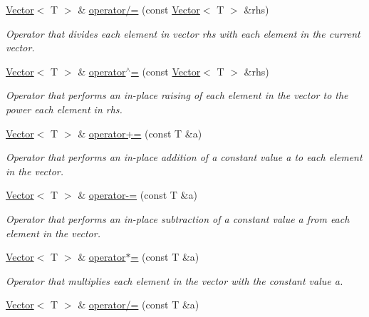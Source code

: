\begin{DoxyCompactItemize}
\mbox{\hyperlink{classVector}{Vector}}$<$ T $>$ \& \mbox{\hyperlink{classVector_adbf519ce5d68eb131947137e30596dc1}{operator/=}} (const \mbox{\hyperlink{classVector}{Vector}}$<$ T $>$ \&rhs)
\begin{DoxyCompactList}\small\item\em Operator that divides each element in vector {\ttfamily rhs} with each element in the current vector. \end{DoxyCompactList}\item 
\mbox{\hyperlink{classVector}{Vector}}$<$ T $>$ \& \mbox{\hyperlink{classVector_acd4d558272832a19d614468400ca605d}{operator$^\wedge$=}} (const \mbox{\hyperlink{classVector}{Vector}}$<$ T $>$ \&rhs)
\begin{DoxyCompactList}\small\item\em Operator that performs an in-\/place raising of each element in the vector to the power each element in {\ttfamily rhs}. \end{DoxyCompactList}\item 
\mbox{\hyperlink{classVector}{Vector}}$<$ T $>$ \& \mbox{\hyperlink{classVector_a5650df0775f0677f76259cd3f474dded}{operator+=}} (const T \&a)
\begin{DoxyCompactList}\small\item\em Operator that performs an in-\/place addition of a constant value {\ttfamily a} to each element in the vector. \end{DoxyCompactList}\item 
\mbox{\hyperlink{classVector}{Vector}}$<$ T $>$ \& \mbox{\hyperlink{classVector_a7581aba7a67b45ff1b2848d37e00cfa1}{operator-\/=}} (const T \&a)
\begin{DoxyCompactList}\small\item\em Operator that performs an in-\/place subtraction of a constant value {\ttfamily a} from each element in the vector. \end{DoxyCompactList}\item 
\mbox{\hyperlink{classVector}{Vector}}$<$ T $>$ \& \mbox{\hyperlink{classVector_a02e9c5296c7ddb1a2047a8c80d93e0d5}{operator$\ast$=}} (const T \&a)
\begin{DoxyCompactList}\small\item\em Operator that multiplies each element in the vector with the constant value {\ttfamily a}. \end{DoxyCompactList}\item 
\mbox{\hyperlink{classVector}{Vector}}$<$ T $>$ \& \mbox{\hyperlink{classVector_a358eca4649d02b3bbab359484eb93140}{operator/=}} (const T \&a)

\end{DoxyCompactItemize}
